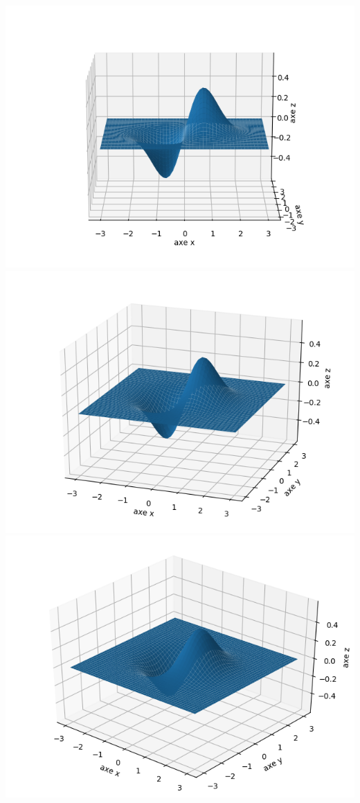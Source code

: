 \documentclass[11pt,class=report,crop=false]{standalone}
\begin{document}
\begin{exemple}
\begin{center}
\includegraphics[scale=\myscale,scale=0.5]{figures/fonctions-surface-1a}
\includegraphics[scale=\myscale,scale=0.5]{figures/fonctions-surface-1b}
\includegraphics[scale=\myscale,scale=0.5]{figures/fonctions-surface-1c}

\end{center}
\end{exemple}
\end{document}
